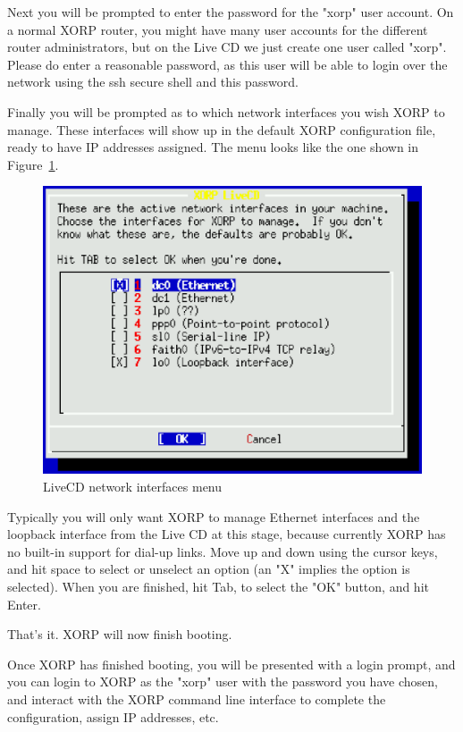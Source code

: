 Next you will be prompted to enter the password for the "xorp" user
account.  On a normal XORP router, you might have many user accounts
for the different router administrators, but on the Live CD we just
create one user called "xorp".  Please do enter a reasonable password,
as this user will be able to login over the network using the ssh
secure shell and this password.

Finally you will be prompted as to which network interfaces you wish
XORP to manage.  These interfaces will show up in the default XORP
configuration file, ready to have IP addresses assigned.  The menu
looks like the one shown in Figure~\ref{fig:livecd:cd4}.

\begin{figure}[h]
  \begin{center}
    \includegraphics[width=6.0in]{figs/cd4}
    \caption{LiveCD network interfaces menu}
    \label{fig:livecd:cd4}
  \end{center}
\end{figure}

Typically you will only want XORP to manage Ethernet interfaces and
the loopback interface from the Live CD at this stage, because currently
XORP has no built-in support for dial-up links.  Move up and down using the
cursor keys, and hit space to select or unselect an option (an "X"
implies the option is selected).  When you are finished, hit Tab, to
select the "OK" button, and hit Enter.

That's it.  XORP will now finish booting.

Once XORP has finished booting, you will be presented with a login
prompt, and you can login to XORP as the "xorp" user with the password
you have chosen, and interact with the XORP command line interface to
complete the configuration, assign IP addresses, etc.

